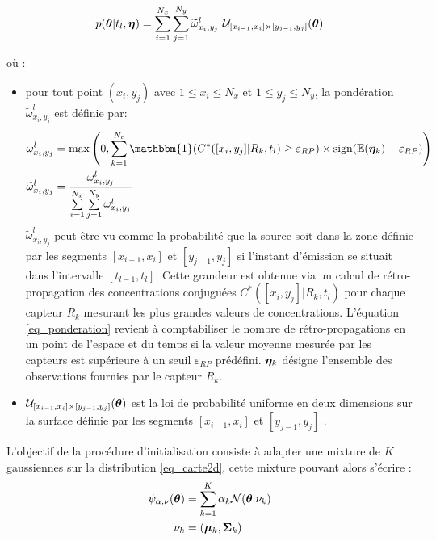 \begin{equation}
p({\bm{\theta}} | t_l,{\bm{\eta}}) = \sum\limits_{i=1}^{N_x} \sum\limits_{j=1}^{N_y} \widetilde{\omega}_{x_i,y_j}^l ~  \mathcal{U}_{[x_{i-1},x_i]\times [y_{j-1},y_j]}({\bm{\theta}})
\label{eq_carte2d}
\end{equation}

où :
\begin{itemize}
	\item pour tout point $(x_i,y_j)$ avec $1\leq x_i \leq N_x$ et $1 \leq y_j \leq N_y$, la pondération $\widetilde{\omega}_{x_i,y_j}^l$ est définie par:
	\begin{equation}
		\begin{split}
			\omega_{x_i,y_j}^l &= \max\left(0, \sum\limits_{k=1}^{N_c} \mathbbm{1}(C^*([x_i,y_j] | R_k,t_l) \geq \varepsilon_{RP}) \times \text{sign}(\mathbb{E}({\VecObs_k}) - \varepsilon_{RP})\right) \\
			\widetilde{\omega}_{x_i,y_j}^l &= \dfrac{\omega_{x_i,y_j}^l}{\sum\limits_{i=1}^{N_x}\sum\limits_{j=1}^{N_y}\omega_{x_i,y_j}^l}
		\end{split}
		\label{eq_ponderation}
	\end{equation}
	$\widetilde{\omega}_{x_i,y_j}^l$ {peut être vu comme} la probabilité que la source soit dans la zone définie par les segments $[x_{i-1},x_i]$ et $[y_{j-1},y_j]$ si l'instant d'émission se situait dans l'intervalle $[t_{l-1},t_l]$. Cette grandeur est obtenue via un calcul de rétro-propagation des concentrations conjuguées $C^*([x_i,y_j] | R_k,t_l) $ pour chaque capteur {$R_k$} mesurant les plus grandes valeurs de concentrations. L'équation \eqref{eq_ponderation} revient à comptabiliser le nombre de rétro-propagations en un point de l'espace et du temps si la valeur moyenne mesurée par les capteurs est supérieure à un seuil $\varepsilon_{RP}$ prédéfini. {${\bm{\eta}}_k$ désigne l'ensemble des observations fournies par le capteur $R_k$.}
	\item $\mathcal{U}_{[x_{i-1},x_i]\times [y_{j-1},y_j]}({\bm{\theta}})$ est la loi de probabilité uniforme en deux dimensions sur la surface définie par les segments $[x_{i-1},x_i]$ et $[y_{j-1},y_j]$ . \\
\end{itemize}

L'objectif de la procédure d'initialisation consiste à adapter une mixture de $K$ gaussiennes sur la distribution \eqref{eq_carte2d}, cette mixture pouvant alors s'écrire : 
\begin{equation}
\begin{split}
\psi_{\alpha, \nu}({\bm{\theta}}) &= \sum\limits_{k=1}^K \alpha_k \mathcal{N}({\bm{\theta}} | \nu_k) \\
\nu_k &= ({\bm{\mu}}_k, {\bm{\Sigma}}_k)
\end{split}
\end{equation}

